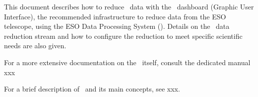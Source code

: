 This document describes how to reduce \instname\ data with the \edpsgui\
dashboard (Graphic User Interface), the recommended infrastructure to
reduce data from the ESO telescope, using the ESO Data Processing
System (\edps).  Details on the \instname\ data reduction stream and
how to configure the reduction to meet specific scientific needs are
also given.

For a more extensive documentation on the \edpsgui\ itself, consult the dedicated manual xxx%

For a brief description of \edps\ and its main concepts, see xxx.%
